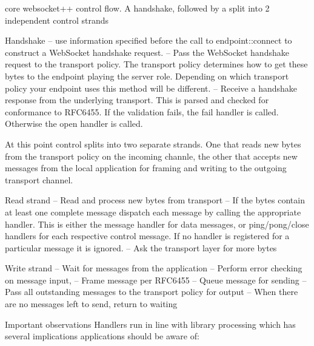 core websocket++ control flow. A handshake, followed by a split into 2 independent control strands
\begin{DoxyItemize}
\item Handshake -- use information specified before the call to endpoint\+::connect to construct a Web\+Socket handshake request. -- Pass the Web\+Socket handshake request to the transport policy. The transport policy determines how to get these bytes to the endpoint playing the server role. Depending on which transport policy your endpoint uses this method will be different. -- Receive a handshake response from the underlying transport. This is parsed and checked for conformance to R\+F\+C6455. If the validation fails, the fail handler is called. Otherwise the open handler is called.
\item At this point control splits into two separate strands. One that reads new bytes from the transport policy on the incoming channle, the other that accepts new messages from the local application for framing and writing to the outgoing transport channel.
\item Read strand -- Read and process new bytes from transport -- If the bytes contain at least one complete message dispatch each message by calling the appropriate handler. This is either the message handler for data messages, or ping/pong/close handlers for each respective control message. If no handler is registered for a particular message it is ignored. -- Ask the transport layer for more bytes
\item Write strand -- Wait for messages from the application -- Perform error checking on message input, -- Frame message per R\+F\+C6455 -- Queue message for sending -- Pass all outstanding messages to the transport policy for output -- When there are no messages left to send, return to waiting
\end{DoxyItemize}

Important observations Handlers run in line with library processing which has several implications applications should be aware of\+: 